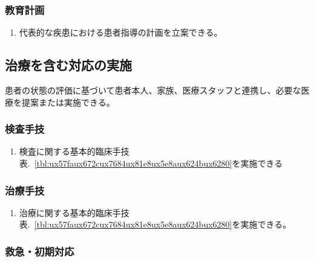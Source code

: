 \hypertarget{ux6559ux80b2ux8a08ux753b}{%
\subsubsection{教育計画}\label{ux6559ux80b2ux8a08ux753b}}

\begin{enumerate}
\def\labelenumi{\arabic{enumi}.}
\tightlist
\item
  代表的な疾患における患者指導の計画を立案できる。
\end{enumerate}

\hypertarget{ux6cbbux7642ux3092ux542bux3080ux5bfeux5fdcux306eux5b9fux65bd}{%
\subsection{治療を含む対応の実施}\label{ux6cbbux7642ux3092ux542bux3080ux5bfeux5fdcux306eux5b9fux65bd}}

患者の状態の評価に基づいて患者本人、家族、医療スタッフと連携し、必要な医療を提案または実施できる。

\hypertarget{ux691cux67fbux624bux6280}{%
\subsubsection{検査手技}\label{ux691cux67fbux624bux6280}}

\begin{enumerate}
\def\labelenumi{\arabic{enumi}.}
\tightlist
\item
  検査に関する基本的臨床手技表.~\ref{tbl:ux57faux672cux7684ux81e8ux5e8aux624bux6280}を実施できる
\end{enumerate}

\hypertarget{ux6cbbux7642ux624bux6280}{%
\subsubsection{治療手技}\label{ux6cbbux7642ux624bux6280}}

\begin{enumerate}
\def\labelenumi{\arabic{enumi}.}
\tightlist
\item
  治療に関する基本的臨床手技表.~\ref{tbl:ux57faux672cux7684ux81e8ux5e8aux624bux6280}を実施できる。
\end{enumerate}

\hypertarget{ux6551ux6025ux521dux671fux5bfeux5fdc}{%
\subsubsection{救急・初期対応}\label{ux6551ux6025ux521dux671fux5bfeux5fdc}}

